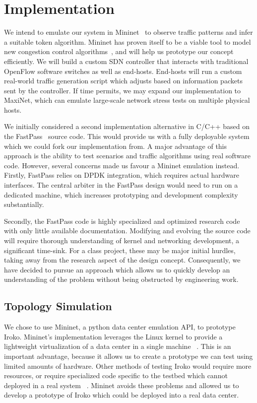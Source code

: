 

\section{Implementation}
\label{sec:implementation}
We intend to emulate our system in Mininet~\cite{mininet} to observe traffic 
patterns and infer a suitable token algorithm. Mininet has proven itself to be 
a viable tool to model new congestion control 
algorithms~\cite{mininet_learning}, and will help us prototype our concept 
efficiently. We will build a custom SDN controller that interacts with 
traditional OpenFlow software switches as well as end-hosts. End-hosts will run 
a custom real-world traffic generation script which adjusts based on 
information packets sent by the controller.
If time permits, we may expand our implementation to MaxiNet, which can emulate 
large-scale network stress tests on multiple physical hosts.

We initially considered a second implementation alternative in C/C++ based on 
the FastPass~\cite{fastpass} source code. This would provide us with a fully 
deployable system which we could fork our implementation from. A major 
advantage of this approach is the ability to test scenarios and traffic 
algorithms using real software code.
However, several concerns made us favour a Mininet emulation instead.
Firstly, FastPass relies on DPDK integration, which requires actual hardware 
interfaces. The central arbiter in the FastPass design would need to run on a 
dedicated machine, which increases prototyping and development complexity 
substantially.

Secondly, the FastPass code is highly specialized and optimized research code 
with only little available documentation. Modifying and evolving the source 
code will require thorough understanding of kernel and networking development, 
a significant time-sink. For a class project, these may be major initial 
hurdles, taking away from the research aspect of the design concept.
Consequently, we have decided to pursue an approach which allows us to quickly 
develop an understanding of the problem without being obstructed by engineering 
work.

\subsection{Topology Simulation}
We chose to use  Mininet, a python data center emulation API, to prototype Iroko. Mininet's implementation leverages the Linux kernel to provide a lightweight virtualization of a data center in a single machine ~\cite{mininet}. This is an important advantage, because it allows us to create a prototype we can test using limited amounts of hardware. Other methods of testing Iroko would require more resources, or require specialized code specific to the testbed which cannot deployed in a real system ~\cite{mininet}. Mininet avoids these problems and allowed us to develop a prototype of Iroko which could be deployed into a real data center. 

